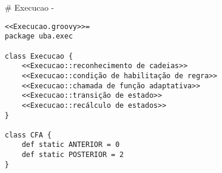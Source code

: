 # Execucao {-}

\begin{lstlisting}[style=java]
<<Execucao.groovy>>=
package uba.exec

class Execucao {
    <<Execucao::reconhecimento de cadeias>>
    <<Execucao::condição de habilitação de regra>>
    <<Execucao::chamada de função adaptativa>>
    <<Execucao::transição de estado>>
    <<Execucao::recálculo de estados>>
}

class CFA {
    def static ANTERIOR = 0
    def static POSTERIOR = 2
}
\end{lstlisting}
